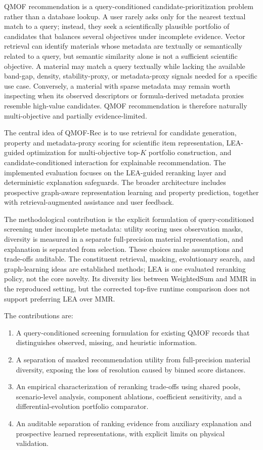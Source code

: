 \documentclass[12pt,a4paper]{article}
\begin{document}
QMOF recommendation is a query-conditioned candidate-prioritization problem rather than a database lookup. A user rarely asks only for the nearest textual match to a query; instead, they seek a scientifically plausible portfolio of candidates that balances several objectives under incomplete evidence. Vector retrieval can identify materials whose metadata are textually or semantically related to a query, but semantic similarity alone is not a sufficient scientific objective. A material may match a query textually while lacking the available band-gap, density, stability-proxy, or metadata-proxy signals needed for a specific use case. Conversely, a material with sparse metadata may remain worth inspecting when its observed descriptors or formula-derived metadata proxies resemble high-value candidates. QMOF recommendation is therefore naturally multi-objective and partially evidence-limited.

The central idea of QMOF-Rec is to use retrieval for candidate generation, property and metadata-proxy scoring for scientific item representation, LEA-guided optimization for multi-objective top-$K$ portfolio construction, and candidate-conditioned interaction for explainable recommendation. The implemented evaluation focuses on the LEA-guided reranking layer and deterministic explanation safeguards. The broader architecture includes prospective graph-aware representation learning and property prediction, together with retrieval-augmented assistance and user feedback.

The methodological contribution is the explicit formulation of query-conditioned screening under incomplete metadata: utility scoring uses observation masks, diversity is measured in a separate full-precision material representation, and explanation is separated from selection. These choices make assumptions and trade-offs auditable. The constituent retrieval, masking, evolutionary search, and graph-learning ideas are established methods; LEA is one evaluated reranking policy, not the core novelty. Its diversity lies between WeightedSum and MMR in the reproduced setting, but the corrected top-five runtime comparison does not support preferring LEA over MMR.

The contributions are:
\begin{enumerate}[leftmargin=*,label=\arabic*.]
\item A query-conditioned screening formulation for existing QMOF records that distinguishes observed, missing, and heuristic information.
\item A separation of masked recommendation utility from full-precision material diversity, exposing the loss of resolution caused by binned score distances.
\item An empirical characterization of reranking trade-offs using shared pools, scenario-level analysis, component ablations, coefficient sensitivity, and a differential-evolution portfolio comparator.
\item An auditable separation of ranking evidence from auxiliary explanation and prospective learned representations, with explicit limits on physical validation.
\end{enumerate}
\end{document}
